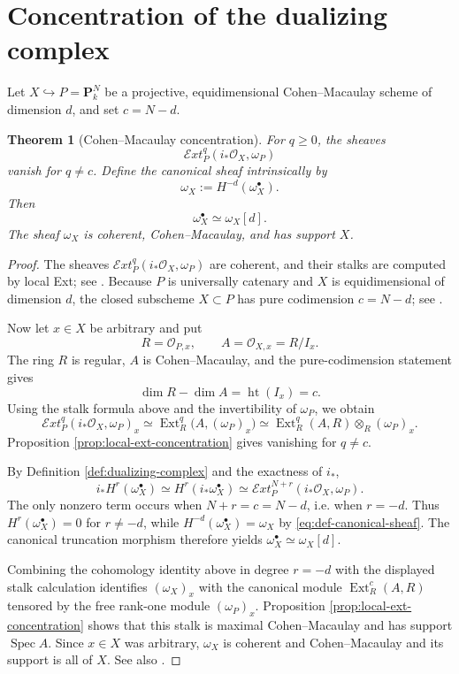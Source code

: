 \documentclass[11pt,a4paper]{article}
\newtheorem{theorem}{Theorem}[section]
\theoremstyle{definition}
\theoremstyle{remark}
\newcommand{\OO}{\mathcal O}
\newcommand{\PP}{\mathbf P}
\newcommand{\Spec}{\operatorname{Spec}}
\newcommand{\Ext}{\operatorname{Ext}}
\newcommand{\shExt}{\mathcal E\!xt}
\newcommand{\height}{\operatorname{ht}}
\begin{document}
\section{Concentration of the dualizing complex}

Let $X\hookrightarrow P=\PP^N_k$ be a projective, equidimensional
Cohen--Macaulay scheme of dimension $d$, and set $c=N-d$.

\begin{theorem}[Cohen--Macaulay concentration]
\label{thm:CM-concentration}
For $q\geq0$, the sheaves
\[
  \shExt_P^q(i_*\OO_X,\omega_P)
\]
vanish for $q\neq c$. Define the canonical sheaf intrinsically by
\begin{equation}\label{eq:def-canonical-sheaf}
  \omega_X:=H^{-d}(\omega_X^\bullet).
\end{equation}
Then
\begin{equation}\label{eq:CM-concentration}
  \omega_X^\bullet\simeq\omega_X[d].
\end{equation}
The sheaf $\omega_X$ is coherent, Cohen--Macaulay, and has support $X$.
\end{theorem}

\begin{proof}
The sheaves $\shExt_P^q(i_*\OO_X,\omega_P)$ are coherent, and their stalks
are computed by local Ext; see
\cite[Chapter III, Proposition 6.8]{HartshorneAG}. Because $P$ is universally
catenary and $X$ is equidimensional of dimension $d$, the closed subscheme
$X\subset P$ has pure codimension $c=N-d$; see
\cite[Tags 02JB and 02I6]{Stacks}.

Now let $x\in X$ be arbitrary and put
\[
  R=\OO_{P,x},\qquad A=\OO_{X,x}=R/I_x.
\]
The ring $R$ is regular, $A$ is Cohen--Macaulay, and the pure-codimension
statement gives
\[
  \dim R-\dim A=\height(I_x)=c.
\]
Using the stalk formula above and the invertibility of $\omega_P$, we obtain
\[
  \shExt_P^q(i_*\OO_X,\omega_P)_x
  \simeq\Ext_R^q\bigl(A,(\omega_P)_x\bigr)
  \simeq\Ext_R^q(A,R)\otimes_R(\omega_P)_x.
\]
Proposition \ref{prop:local-ext-concentration} gives vanishing for $q\neq c$.

By Definition \ref{def:dualizing-complex} and the exactness of $i_*$,
\[
  i_*H^r(\omega_X^\bullet)
  \simeq H^r(i_*\omega_X^\bullet)
  \simeq\shExt_P^{N+r}(i_*\OO_X,\omega_P).
\]
The only nonzero term occurs when $N+r=c=N-d$, i.e. when $r=-d$. Thus
$H^r(\omega_X^\bullet)=0$ for $r\neq-d$, while
$H^{-d}(\omega_X^\bullet)=\omega_X$ by
\eqref{eq:def-canonical-sheaf}. The canonical truncation morphism therefore
yields
$\omega_X^\bullet\simeq\omega_X[d]$.

Combining the cohomology identity above in degree $r=-d$ with the displayed
stalk calculation identifies $(\omega_X)_x$ with the canonical module
$\Ext_R^c(A,R)$ tensored by the free rank-one module $(\omega_P)_x$.
Proposition
\ref{prop:local-ext-concentration} shows that this stalk is maximal
Cohen--Macaulay and has support $\Spec A$. Since $x\in X$ was arbitrary,
$\omega_X$ is coherent and Cohen--Macaulay and its support is all of $X$.
See also \cite[Tags 0AWT and 0FVZ]{Stacks}.
\end{proof}
\end{document}
